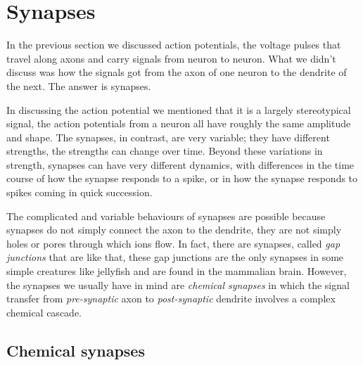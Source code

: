 \documentclass[12pt]{article}
\begin{document}
\section*{Synapses}

In the previous section we discussed action potentials, the voltage
pulses that travel along axons and carry signals from neuron to
neuron. What we didn't discuss was how the signals got from the axon
of one neuron to the dendrite of the next. The answer is synapses. 

In discussing the action potential we mentioned that it is a largely
stereotypical signal, the action potentials from a neuron all have
roughly the same amplitude and shape. The synapses, in contrast, are
very variable; they have different strengths, the strengths can change
over time. Beyond these variations in strength, synapses can have very
different dynamics, with differences in the time course of how the
synapse responds to a spike, or in how the synapse responds to spikes
coming in quick succession.

The complicated and variable behaviours of synapses are possible
because synapses do not simply connect the axon to the dendrite, they
are not simply holes or pores through which ions flow. In fact, there
are synapses, called \textsl{gap junctions} that are like that, these
gap junctions are the only synapses in some simple creatures like
jellyfish and are found in the mammalian brain. However, the synapses
we usually have in mind are \textsl{chemical synapses} in which the
signal transfer from \textsl{pre-synaptic} axon to
\textsl{post-synaptic} dendrite involves a complex chemical cascade.


\subsection*{Chemical synapses} 
\end{document}

